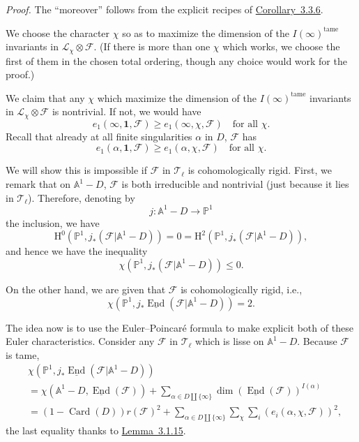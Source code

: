 \textit{Proof.} The ``moreover'' follows from the explicit recipes of
\hyperref[cor:3.3.6]{Corollary~3.3.6}.

We choose the character \(\chi\) so as to maximize the dimension of the
\(I(\infty)^{\mathrm{tame}}\) invariants in
\(\mathcal{L}_\chi\otimes\mathcal{F}\). (If there is more than one \(\chi\)
which works, we choose the first of them in the chosen total ordering, though
any choice would work for the proof.)

We claim that any \(\chi\) which maximize the dimension of the
\(I(\infty)^{\mathrm{tame}}\) invariants in
\(\mathcal{L}_\chi\otimes\mathcal{F}\) is nontrivial. If not, we would have
\[
  e_1(\infty,\mathbf{1},\mathcal{F})\geq
  e_1(\infty,\chi,\mathcal{F})\quad\text{for all \(\chi\)}.
\]
Recall that already at all finite singularities \(\alpha\) in \(D\),
\(\mathcal{F}\) has
\[
  e_1(\alpha,\mathbf{1},\mathcal{F})\geq
  e_1(\alpha,\chi,\mathcal{F})\quad\text{for all \(\chi\)}.
\]

We will show this is impossible if \(\mathcal{F}\) in \(\mathcal{T}_\ell\) is
cohomologically rigid. First, we remark that on \(\mathbb{A}^1-D\),
\(\mathcal{F}\) is both irreducible and nontrivial (just because it lies in
\(\mathcal{T}_\ell\)). Therefore, denoting by
\[
  j:\mathbb{A}^1-D\to\mathbb{P}^1
\]
the inclusion, we have
\[
  \mathrm{H}^0(\mathbb{P}^1,j_*(\mathcal{F}\vert\mathbb{A}^1-D))=0
  =
  \mathrm{H}^2(\mathbb{P}^1,j_*(\mathcal{F}\vert\mathbb{A}^1-D)),
\]
and hence we have the inequality
\[
  \chi(\mathbb{P}^1,j_*(\mathcal{F}\vert\mathbb{A}^1-D))\leq 0.
\]

On the other hand, we are given that \(\mathcal{F}\) is cohomologically rigid,
i.e.,
\[
  \chi(\mathbb{P}^1,j_*\underline{\operatorname{End}}(\mathcal{F}\vert\mathbb{A}^1-D))=2.
\]

The idea now is to use the Euler--Poincaré formula to make explicit both of
these Euler characteristics. Consider any \(\mathcal{F}\) in
\(\mathcal{T}_\ell\) which is lisse on \(\mathbb{A}^1-D\). Because
\(\mathcal{F}\) is tame,
\[
\begin{aligned}
  &\chi(\mathbb{P}^1,j_*\underline{\operatorname{End}}(\mathcal{F}\vert\mathbb{A}^1-D))\\
  &=
  \chi(\mathbb{A}^1-D,\underline{\operatorname{End}}(\mathcal{F}))
  +\sum_{\alpha\in D\amalg\{\infty\}}
  \dim(\underline{\operatorname{End}}(\mathcal{F}))^{I(\alpha)}\\
  &=
  (1-\operatorname{Card}(D))r(\mathcal{F})^2
  +\sum_{\alpha\in D\amalg\{\infty\}}\sum_\chi\sum_i
  (e_i(\alpha,\chi,\mathcal{F}))^2,
\end{aligned}
\]
the last equality thanks to \hyperref[lem:3.1.15]{Lemma~3.1.15}.


